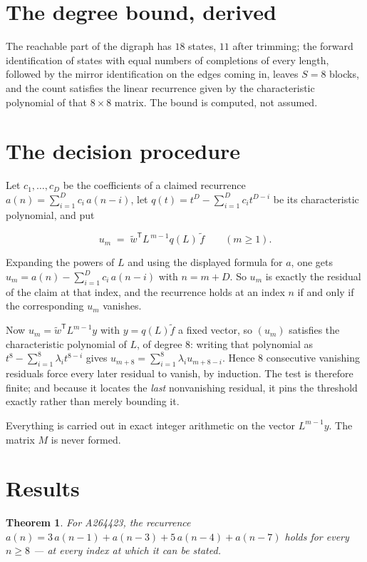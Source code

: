 \documentclass[11pt]{article}
\newtheorem{theorem}{Theorem}
\theoremstyle{definition}
\begin{document}
\section{The degree bound, derived}

The reachable part of the digraph has $18$ states, $11$ after trimming; the forward identification of states with equal numbers of completions of every length, followed by the mirror identification on the edges coming in, leaves $S = 8$ blocks, and the count satisfies the linear recurrence given by the characteristic polynomial of that $8\times8$ matrix. The bound is computed, not assumed.

\section{The decision procedure}

Let $c_1,\dots,c_D$ be the coefficients of a claimed recurrence $a(n) = \sum_{i=1}^{D} c_i\,a(n-i)$, let $q(t) = t^{D} - \sum_{i=1}^{D} c_i t^{D-i}$ be its characteristic polynomial, and put

\[u_m \;=\; \tilde w^{\mathsf T} L^{\,m-1} q(L)\,\tilde f \qquad (m \ge 1).\]

Expanding the powers of $L$ and using the displayed formula for $a$, one gets $u_m = a(n) - \sum_{i=1}^{D} c_i\,a(n-i)$ with $n = m + D$. So $u_m$ is exactly the residual of the claim at that index, and the recurrence holds at an index $n$ if and only if the corresponding $u_m$ vanishes.

Now $u_m = \tilde w^{\mathsf T} L^{m-1} y$ with $y = q(L)\tilde f$ a fixed vector, so $(u_m)$ satisfies the characteristic polynomial of $L$, of degree $8$: writing that polynomial as $t^{8} - \sum_{i=1}^{8} \lambda_i t^{8-i}$ gives $u_{m+8} = \sum_{i=1}^{8} \lambda_i u_{m+8-i}$. Hence $8$ consecutive vanishing residuals force every later residual to vanish, by induction. The test is therefore finite; and because it locates the {\itshape last} nonvanishing residual, it pins the threshold exactly rather than merely bounding it.

Everything is carried out in exact integer arithmetic on the vector $L^{m-1}y$. The matrix $M$ is never formed.

\section{Results}

\begin{theorem} For A264423, the recurrence $a(n) = 3\,a(n-1) + a(n-3) + 5\,a(n-4) + a(n-7)$ holds for every $n \ge 8$ --- at every index at which it can be stated.\end{theorem}
\end{document}
